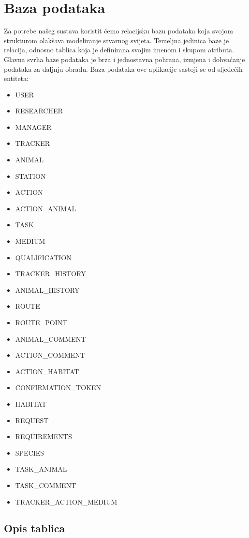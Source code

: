 				
		\section{Baza podataka}
			
				\noindent Za potrebe našeg sustava koristit ćemo relacijsku bazu podataka koja svojom strukturom olakšava modeliranje stvarnog svijeta. Temeljna jedinica baze je relacija, odnosno tablica koja je definirana svojim imenom i skupom atributa. Glavna svrha baze podataka je brza i jednostavna pohrana, izmjena i dohvaćanje podataka za daljnju obradu. Baza podataka ove aplikacije sastoji se od sljedećih entiteta:
				
				\begin{itemize}
					\item USER
					\item RESEARCHER
					\item MANAGER
					\item TRACKER
					\item ANIMAL
					\item STATION
					\item ACTION
					\item ACTION\_ANIMAL
					\item TASK
					\item MEDIUM
					\item QUALIFICATION
					\item TRACKER\_HISTORY
					\item ANIMAL\_HISTORY
					\item ROUTE
					\item ROUTE\_POINT
					\item ANIMAL\_COMMENT
					\item ACTION\_COMMENT
					\item ACTION\_HABITAT
					\item CONFIRMATION\_TOKEN
					\item HABITAT
					\item REQUEST
					\item REQUIREMENTS
					\item SPECIES
					\item TASK\_ANIMAL
					\item TASK\_COMMENT
					\item TRACKER\_ACTION\_MEDIUM
				\end{itemize}
				
		\subsection{Opis tablica}
				
